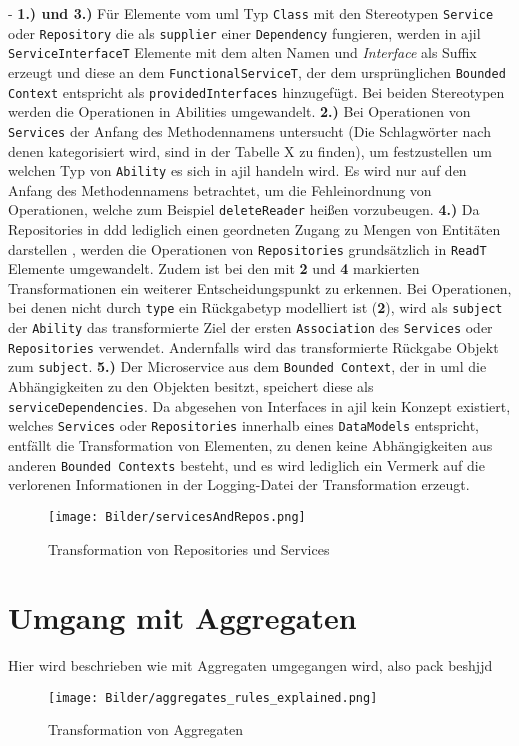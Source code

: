 \documentclass[
	oneside,  %
	ngerman, 
	final, 
	11pt, 
	a4paper, 
	1.1headlines, 
	headinclude=false, 
	footinclude=false, 
	mpinclude=false, 
	pagesize, 
	onecolumn, 
	titlepage, 
	parskip=half, 
	headsepline, 
	chapterprefix=false, 
	version=first, 
	listof=totoc, 
	bibliography=totoc, 
	toc=graduated, 
	fleqn
]{scrbook}
\begin{document}
- \textbf{1.) und 3.)} Für Elemente vom \ac{uml} Typ \texttt{Class} mit den Stereotypen \texttt{Service} oder \texttt{Repository} die als \texttt{supplier} einer \texttt{Dependency} fungieren, werden in \ac{ajil} \texttt{ServiceInterfaceT} Elemente mit dem alten Namen und \textit{Interface} als Suffix erzeugt und diese an dem \texttt{FunctionalServiceT}, der dem ursprünglichen \texttt{Bounded Context} entspricht als \texttt{providedInterfaces} hinzugefügt. Bei beiden Stereotypen werden die Operationen in Abilities umgewandelt. \textbf{2.)} Bei Operationen von \texttt{Services} der Anfang des Methodennamens untersucht (Die Schlagwörter nach denen kategorisiert wird, sind in der Tabelle X zu finden), um festzustellen um welchen Typ von \texttt{Ability} es sich in \ac{ajil} handeln wird. Es wird nur auf den Anfang des Methodennamens betrachtet, um die Fehleinordnung von Operationen, welche zum Beispiel \texttt{deleteReader} heißen vorzubeugen. \textbf{4.)} Da Repositories in \ac{ddd} lediglich einen geordneten Zugang zu Mengen von Entitäten darstellen \cite{DDDEvans}, werden die Operationen von \texttt{Repositories}  grundsätzlich in \texttt{ReadT} Elemente umgewandelt. Zudem ist bei den mit \textbf{2} und \textbf{4} markierten Transformationen ein weiterer Entscheidungspunkt zu erkennen. Bei Operationen, bei denen nicht durch \texttt{type} ein Rückgabetyp modelliert ist (\textbf{2}), wird als \texttt{subject} der \texttt{Ability} das transformierte Ziel der ersten \texttt{Association} des \texttt{Services} oder \texttt{Repositories} verwendet. Andernfalls wird das transformierte Rückgabe Objekt zum \texttt{subject}. \textbf{5.)} Der Microservice aus dem \texttt{Bounded Context}, der in \ac{uml} die Abhängigkeiten zu den Objekten besitzt, speichert diese als \texttt{serviceDependencies}. Da abgesehen von Interfaces in \ac{ajil} kein Konzept existiert, welches \texttt{Services} oder \texttt{Repositories} innerhalb eines \texttt{DataModels} entspricht, entfällt die Transformation von Elementen, zu denen keine Abhängigkeiten aus anderen \texttt{Bounded Contexts} besteht, und es wird lediglich ein Vermerk auf die verlorenen Informationen in der Logging-Datei der Transformation erzeugt.
\begin{figure}
\texttt{[image: Bilder/servicesAndRepos.png]}
\caption{Transformation von Repositories und Services}
\end{figure}
\section{Umgang mit Aggregaten}
Hier wird beschrieben wie mit Aggregaten umgegangen wird, also pack beshjjd
\begin{figure}
\texttt{[image: Bilder/aggregates\_rules\_explained.png]}
\caption{Transformation von Aggregaten}
\end{figure}
\end{document}
